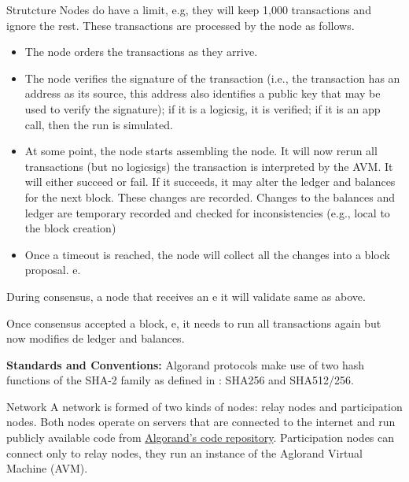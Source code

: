 \documentclass[10pt,a4paper]{article}
\begin{document}
\begin{section}{Strutcture}
Nodes do have a limit, e.g, they will
keep 1,000 transactions and ignore the rest.
These transactions are processed by the node as follows.
\begin{itemize}
    \item The node orders the transactions as they arrive.
    \item The node verifies the signature of the transaction (i.e., the transaction has an 
    address as its source, this address also identifies a public key that may be used to 
    verify the signature); if it is a logicsig, it is verified; if it is an app call, then
    the run is simulated.
    \item At some point, the node starts assembling the node. It will now rerun all transactions
    (but no logicsigs) the transaction is interpreted by the AVM. It will either succeed or
    fail. If it succeeds, it may alter the ledger and balances for the next block. These 
    changes are recorded. Changes to the balances and ledger are temporary recorded and
    checked for inconsistencies (e.g., local to the block creation)
    \item Once a timeout is reached, the node will collect all the changes into a block 
    proposal. e.
\end{itemize}

During consensus, a node that receives an e it will validate same as above.

Once consensus accepted a block, e, it needs to run all transactions again
but now modifies de ledger and balances. 


{\bf Standards and Conventions:}
Algorand protocols make use of two hash functions of the SHA-2 family
as defined in \cite{NIST.FIPS.180-4}: SHA256 and SHA512/256.

    
\begin{subsection}{Network}
A network is formed of two kinds of nodes: {\sf relay nodes}
and {\sf participation nodes}. 
Both nodes operate on servers that are connected to the internet and run publicly
available code from \href{https://github.com/algorand/go-algorand}{Algorand's code repository}.
Participation nodes can connect only to relay nodes, they run an instance
of the Aglorand Virtual Machine (AVM).


\end{subsection}
\end{section}
\end{document}
